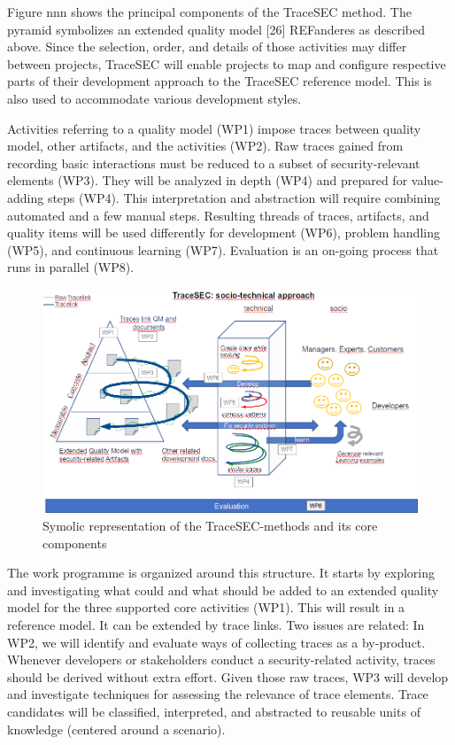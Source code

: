 
Figure nnn shows the principal components of the TraceSEC method. The pyramid symbolizes an extended quality model [26] REFanderes as described above. Since the selection, order, and details of those activities may differ between projects, TraceSEC will enable projects to map and configure respective parts of their development approach to the TraceSEC reference model. This is also used to accommodate various development styles.

Activities referring to a quality model (WP1) impose traces between quality model, other artifacts, and the activities (WP2). Raw traces gained from recording basic interactions must be reduced to a subset of security-relevant elements (WP3). They will be analyzed in depth (WP4) and prepared for value-adding steps (WP4). This interpretation and abstraction will require combining automated and a few manual steps. Resulting threads of traces, artifacts, and quality items will be used differently for development (WP6), problem handling (WP5), and continuous learning (WP7). Evaluation is an on-going process that runs in parallel (WP8).

\begin{figure} \centering
	\includegraphics[width=1.0\textwidth]{resources/work-plan}
	\caption{Symolic representation of the TraceSEC-methods and its core components}
	\label{fig:work-plan}
\end{figure}

The work programme is organized around this structure. It starts by exploring and investigating what could and what should be added to an extended quality model for the three supported core activities (WP1). This will result in a reference model. It can be extended by trace links. Two issues are related: In WP2, we will identify and evaluate ways of collecting traces as a by-product. Whenever developers or stakeholders conduct a security-related activity, traces should be derived without extra effort. Given those raw traces, WP3 will develop and investigate techniques for assessing the relevance of trace elements. Trace candidates will be classified, interpreted, and abstracted to reusable units of knowledge (centered around a scenario). 

